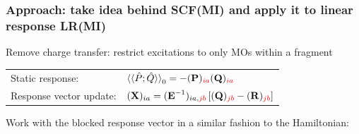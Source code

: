 \documentclass[%
    xcolor=usenames,dvipsnames,svgnames%
]{beamer}
\begin{document}
\begin{frame}
  \frametitle{Approach: take idea behind SCF(MI) and apply it to linear response \textrightarrow{} \textcolor{AlertColor}{LR(MI)}}
  Remove charge transfer: restrict excitations to only MOs within a fragment
  \begin{table}
    \centering
    \begin{tabular}{ll}
      Static response: & \(\braket{\braket{\hat{P};\hat{Q}}}_{0} = -(\boldsymbol{\mathbf{P}})_{\textcolor{red}{ia}}(\boldsymbol{\mathbf{Q}})_{\textcolor{red}{ia}}\) \\
      Response vector update: & \((\boldsymbol{\mathbf{X}})_{ia} = (\boldsymbol{\mathbf{E}}^{-1})_{ia,\textcolor{red}{jb}} \left[ (\boldsymbol{\mathbf{Q}})_{\textcolor{red}{jb}} - (\boldsymbol{\mathbf{R}})_{\textcolor{red}{jb}} \right]\)
    \end{tabular}
  \end{table}
  Work with the blocked response vector in a similar fashion to the Hamiltonian:
  \begin{table}
    \centering
    \begin{tabular}{ccc}

\end{tabular}
\end{table}
\end{frame}
\end{document}
